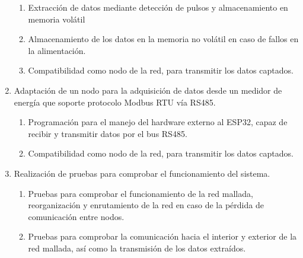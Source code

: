 \documentclass[12pt,letterpaper]{article}
\begin{document}
\begin{enumerate}[1.]
	
	\begin{enumerate}
		
		\item Extracción de datos mediante detección de pulsos y almacenamiento en memoria volátil
		
		\item Almacenamiento de los datos en la memoria no volátil en caso de fallos en la alimentación.
		
		\item Compatibilidad como nodo de la red, para transmitir los datos captados.
		
	\end{enumerate}
	
	
	\item Adaptación de un nodo para la adquisición de datos desde un medidor de energía que soporte protocolo Modbus RTU vía RS485. 

	
	\begin{enumerate}
				
		\item Programación para el manejo del hardware externo al ESP32, capaz de recibir y transmitir datos por el bus RS485.
		
		\item Compatibilidad como nodo de la red, para transmitir los datos captados.
		
	\end{enumerate}


	
	\item Realización de pruebas para comprobar el funcionamiento del sistema.
	
	
	\begin{enumerate}
		
		\item Pruebas para comprobar el funcionamiento de la red mallada, reorganización y enrutamiento de la red en caso de la pérdida de comunicación entre nodos.
		
		\item Pruebas para comprobar la comunicación hacia el interior y exterior de la red mallada, así como la transmisión de los datos extraídos.
		
	\end{enumerate}
	
	
	
	
	
\end{enumerate}
	
	
\newpage
	
\end{document}
